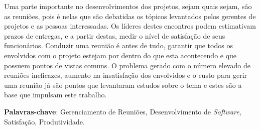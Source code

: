 \begin{resumo}

Uma parte importante no desenvolvimentos dos projetos, sejam quais sejam, são as reuniões, pois é nelas que são debatidas os tópicos levantados pelos gerentes de projetos e as pessoas interessadas. Os líderes destes encontros podem estimativam prazos de entregas, e a partir destas, medir o nível de satisfação de seus funcionários. Conduzir uma reunião é antes de tudo, garantir que todos os envolvidos com o projeto estejam por dentro do que esta acontecendo e que possuem pontos de vistas comuns. O problema gerado com o número elevado de reuniões ineficazes, aumento na insatisfação dos envolvidos e o custo para gerir uma reunião já são pontos que levantaram estudos sobre o tema e estes são a base que impulsam este trabalho.

 \vspace{\onelineskip}

 \noindent
 \textbf{Palavras-chave}: Gerenciamento de Reuniões, Desenvolvimento de \textit{Software}, Satisfação, Produtividade.
\end{resumo}
